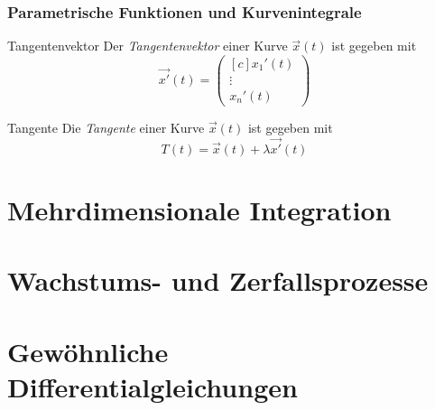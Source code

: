 \documentclass[german]{../spicker}
\newcommand{\vektor}[1]{\begin{pmatrix*}[c] #1 \end{pmatrix*}}
\begin{document}
\subsubsection{Parametrische Funktionen und Kurvenintegrale}

\begin{defi}{Tangentenvektor}
    Der \emph{Tangentenvektor} einer Kurve $\vec{x}(t)$ ist gegeben mit
    $$
        \vec{x'}(t) = \vektor{x_1'(t) \\ \vdots \\ x_n'(t)}
    $$
\end{defi}

\begin{defi}{Tangente}
    Die \emph{Tangente} einer Kurve $\vec{x}(t)$ ist gegeben mit
    $$
        T(t) = \vec{x}(t) + \lambda\vec{x'}(t)
    $$
\end{defi}

\section{Mehrdimensionale Integration}
\section{Wachstums- und Zerfallsprozesse}
\section{Gewöhnliche Differentialgleichungen}

\printindex
\printindex[Beispiele]
\end{document}
